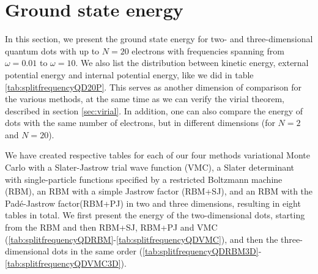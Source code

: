 \section{Ground state energy} \label{sec:energydistribution}
In this section, we present the ground state energy for two- and three-dimensional quantum dots with up to $N=20$ electrons with frequencies spanning from $\omega=0.01$ to $\omega=10$. We also list the distribution between kinetic energy, external potential energy and internal potential energy, like we did in table \eqref{tab:splitfrequencyQD20P}. This serves as another dimension of comparison for the various methods, at the same time as we can verify the virial theorem, described in section \ref{sec:virial}. In addition, one can also compare the energy of dots with the same number of electrons, but in different dimensions (for $N=2$ and $N=20$).

We have created respective tables for each of our four methods variational Monte Carlo with a Slater-Jastrow trial wave function (VMC), a Slater determinant with single-particle functions specified by a restricted Boltzmann machine (RBM), an RBM with a simple Jastrow factor (RBM+SJ), and an RBM with the Padé-Jastrow factor(RBM+PJ) in two and three dimensions, resulting in eight tables in total. We first present the energy of the two-dimensional dots, starting from the RBM and then RBM+SJ, RBM+PJ and VMC (\ref{tab:splitfrequencyQDRBM}-\ref{tab:splitfrequencyQDVMC}), and then the three-dimensional dots in the same order (\ref{tab:splitfrequencyQDRBM3D}-\ref{tab:splitfrequencyQDVMC3D}).

